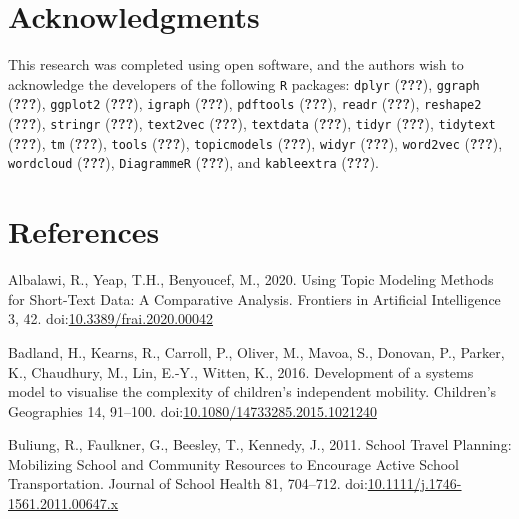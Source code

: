 \documentclass[]{elsarticle} %
\begin{document}
\hypertarget{acknowledgments}{%
\section{Acknowledgments}\label{acknowledgments}}

This research was completed using open software, and the authors wish to
acknowledge the developers of the following \texttt{R} packages:
\texttt{dplyr} ({\textbf{???}}), \texttt{ggraph} ({\textbf{???}}),
\texttt{ggplot2} ({\textbf{???}}), \texttt{igraph} ({\textbf{???}}),
\texttt{pdftools} ({\textbf{???}}), \texttt{readr} ({\textbf{???}}),
\texttt{reshape2} ({\textbf{???}}), \texttt{stringr} ({\textbf{???}}),
\texttt{text2vec} ({\textbf{???}}), \texttt{textdata} ({\textbf{???}}),
\texttt{tidyr} ({\textbf{???}}), \texttt{tidytext} ({\textbf{???}}),
\texttt{tm} ({\textbf{???}}), \texttt{tools} ({\textbf{???}}),
\texttt{topicmodels} ({\textbf{???}}), \texttt{widyr} ({\textbf{???}}),
\texttt{word2vec} ({\textbf{???}}), \texttt{wordcloud} ({\textbf{???}}),
\texttt{DiagrammeR} ({\textbf{???}}), and \texttt{kableextra}
({\textbf{???}}).

\hypertarget{references}{%
\section*{References}\label{references}}

\hypertarget{refs}{}
\leavevmode\hypertarget{ref-albalawiUsingTopicModeling2020}{}%
Albalawi, R., Yeap, T.H., Benyoucef, M., 2020. Using Topic Modeling
Methods for Short-Text Data: A Comparative Analysis. Frontiers in
Artificial Intelligence 3, 42.
doi:\href{https://doi.org/10.3389/frai.2020.00042}{10.3389/frai.2020.00042}

\leavevmode\hypertarget{ref-badlandDevelopmentSystemsModel2016}{}%
Badland, H., Kearns, R., Carroll, P., Oliver, M., Mavoa, S., Donovan,
P., Parker, K., Chaudhury, M., Lin, E.-Y., Witten, K., 2016. Development
of a systems model to visualise the complexity of children's independent
mobility. Children's Geographies 14, 91--100.
doi:\href{https://doi.org/10.1080/14733285.2015.1021240}{10.1080/14733285.2015.1021240}

\leavevmode\hypertarget{ref-buliungSchoolTravelPlanning2011}{}%
Buliung, R., Faulkner, G., Beesley, T., Kennedy, J., 2011. School Travel
Planning: Mobilizing School and Community Resources to Encourage Active
School Transportation. Journal of School Health 81, 704--712.
doi:\href{https://doi.org/10.1111/j.1746-1561.2011.00647.x}{10.1111/j.1746-1561.2011.00647.x}
\end{document}
